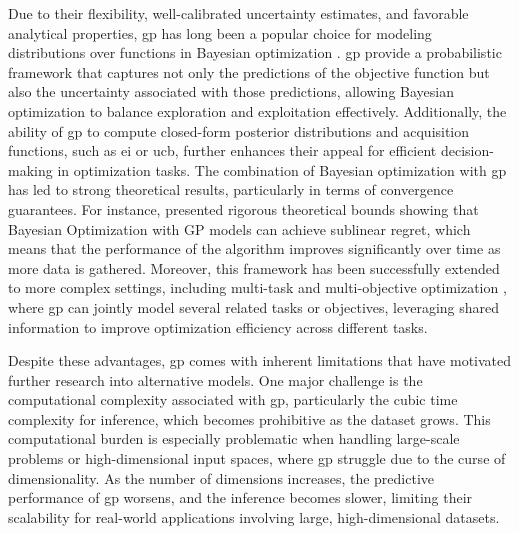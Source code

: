 Due to their flexibility, well-calibrated uncertainty estimates, and favorable analytical properties, \ac{gp} has long been a popular choice for modeling distributions over functions in Bayesian optimization \citep{osborne2009gaussian}. \ac{gp} provide a probabilistic framework that captures not only the predictions of the objective function but also the uncertainty associated with those predictions, allowing Bayesian optimization to balance exploration and exploitation effectively. Additionally, the ability of \ac{gp} to compute closed-form posterior distributions and acquisition functions, such as \ac{ei} or \ac{ucb}, further enhances their appeal for efficient decision-making in optimization tasks. The combination of Bayesian optimization with \ac{gp} has led to strong theoretical results, particularly in terms of convergence guarantees. For instance, \citet{srinivas2009gaussian} presented rigorous theoretical bounds showing that Bayesian Optimization with GP models can achieve sublinear regret, which means that the performance of the algorithm improves significantly over time as more data is gathered. Moreover, this framework has been successfully extended to more complex settings, including multi-task and multi-objective optimization \citep{swersky2013multi}, where \ac{gp} can jointly model several related tasks or objectives, leveraging shared information to improve optimization efficiency across different tasks.

Despite these advantages, \ac{gp} comes with inherent limitations that have motivated further research into alternative models. One major challenge is the computational complexity associated with \ac{gp}, particularly the cubic time complexity for inference, which becomes prohibitive as the dataset grows. This computational burden is especially problematic when handling large-scale problems or high-dimensional input spaces, where \ac{gp} struggle due to the curse of dimensionality. As the number of dimensions increases, the predictive performance of \ac{gp} worsens, and the inference becomes slower, limiting their scalability for real-world applications involving large, high-dimensional datasets.

